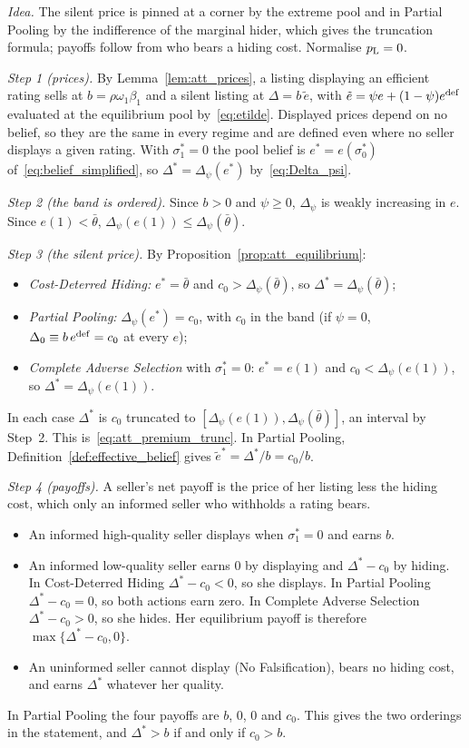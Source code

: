 \upshape
\emph{Idea.} The silent price is pinned at a corner by the extreme pool and in Partial Pooling by the indifference of the marginal hider, which gives the truncation formula; payoffs follow from who bears a hiding cost. Normalise $p_{\rm L}=0$.

\emph{Step 1 (prices).} By Lemma~\ref{lem:att_prices}, a listing displaying an efficient rating sells at $b=\rho\omega_1\beta_1$ and a silent listing at $\Delta=b\,\tilde e$, with $\tilde e=\psi e+(1-\psi)e^{\rm def}$ evaluated at the equilibrium pool by~\eqref{eq:etilde}. Displayed prices depend on no belief, so they are the same in every regime and are defined even where no seller displays a given rating. With $\sigma_1^*=0$ the pool belief is $e^*=e(\sigma_0^*)$ of~\eqref{eq:belief_simplified}, so $\Delta^*=\Delta_\psi(e^*)$ by~\eqref{eq:Delta_psi}.

\emph{Step 2 (the band is ordered).} Since $b>0$ and $\psi\ge0$, $\Delta_\psi$ is weakly increasing in $e$. Since $e(1)<\bar\theta$, $\Delta_\psi(e(1))\le\Delta_\psi(\bar\theta)$.

\emph{Step 3 (the silent price).} By Proposition~\ref{prop:att_equilibrium}:
\begin{itemize}
    \item \emph{Cost-Deterred Hiding:} $e^*=\bar\theta$ and $c_0>\Delta_\psi(\bar\theta)$, so $\Delta^*=\Delta_\psi(\bar\theta)$;
    \item \emph{Partial Pooling:} $\Delta_\psi(e^*)=c_0$, with $c_0$ in the band (if $\psi=0$, $\Delta_0\equiv b\,e^{\rm def}=c_0$ at every $e$);
    \item \emph{Complete Adverse Selection} with $\sigma_1^*=0$: $e^*=e(1)$ and $c_0<\Delta_\psi(e(1))$, so $\Delta^*=\Delta_\psi(e(1))$.
\end{itemize}
In each case $\Delta^*$ is $c_0$ truncated to $[\Delta_\psi(e(1)),\Delta_\psi(\bar\theta)]$, an interval by Step~2. This is~\eqref{eq:att_premium_trunc}. In Partial Pooling, Definition~\ref{def:effective_belief} gives $\tilde e^*=\Delta^*/b=c_0/b$.

\emph{Step 4 (payoffs).} A seller's net payoff is the price of her listing less the hiding cost, which only an informed seller who withholds a rating bears.
\begin{itemize}
    \item An informed high-quality seller displays when $\sigma_1^*=0$ and earns $b$.
    \item An informed low-quality seller earns $0$ by displaying and $\Delta^*-c_0$ by hiding. In Cost-Deterred Hiding $\Delta^*-c_0<0$, so she displays. In Partial Pooling $\Delta^*-c_0=0$, so both actions earn zero. In Complete Adverse Selection $\Delta^*-c_0>0$, so she hides. Her equilibrium payoff is therefore $\max\{\Delta^*-c_0,0\}$.
    \item An uninformed seller cannot display (No Falsification), bears no hiding cost, and earns $\Delta^*$ whatever her quality.
\end{itemize}
In Partial Pooling the four payoffs are $b$, $0$, $0$ and $c_0$. This gives the two orderings in the statement, and $\Delta^*>b$ if and only if $c_0>b$.

